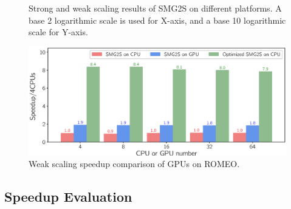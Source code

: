 \begin{figure}[htbp]
	\centering
	\caption{Strong and weak scaling results of SMG2S on different platforms. A base 2 logarithmic scale is used for X-axis, and a base 10 logarithmic scale for Y-axis. }
	\label{fig:scaling-gpu-romeo}
\end{figure}

\begin{figure}
	\centering
	\hfil
	\includegraphics[width=6.2in]{fig/matgen/speedup.eps}%
	\caption{Weak scaling speedup comparison of GPUs on ROMEO.}
	\label{speedup}
\end{figure}

\subsection{Speedup Evaluation}

